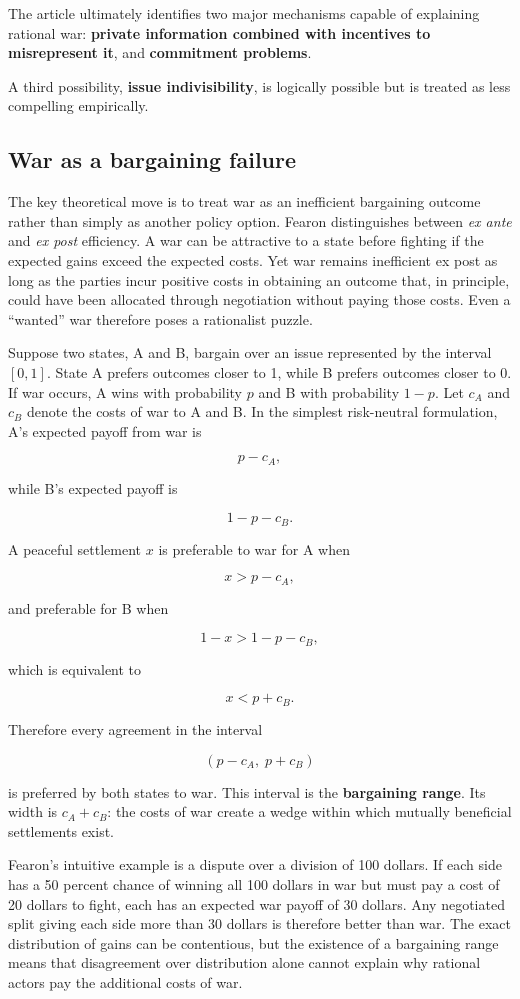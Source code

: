 The article ultimately identifies two major mechanisms capable of explaining rational war: \textbf{private information combined with incentives to misrepresent it}, and \textbf{commitment problems}.

A third possibility, \textbf{issue indivisibility}, is logically possible but is treated as less compelling empirically.

\subsection{War as a bargaining failure}
The key theoretical move is to treat war as an inefficient bargaining outcome rather than simply as another policy option. Fearon distinguishes between \textit{ex ante} and \textit{ex post} efficiency. A war can be attractive to a state before fighting if the expected gains exceed the expected costs. Yet war remains inefficient ex post as long as the parties incur positive costs in obtaining an outcome that, in principle, could have been allocated through negotiation without paying those costs. Even a ``wanted'' war therefore poses a rationalist puzzle.

Suppose two states, A and B, bargain over an issue represented by the interval $[0,1]$. State A prefers outcomes closer to 1, while B prefers outcomes closer to 0. If war occurs, A wins with probability $p$ and B with probability $1-p$. Let $c_A$ and $c_B$ denote the costs of war to A and B. In the simplest risk-neutral formulation, A's expected payoff from war is

\[
p-c_A,
\]

while B's expected payoff is

\[
1-p-c_B.
\]

A peaceful settlement $x$ is preferable to war for A when

\[
x>p-c_A,
\]

and preferable for B when

\[
1-x>1-p-c_B,
\]

which is equivalent to

\[
x<p+c_B.
\]

Therefore every agreement in the interval

\[
(p-c_A,\;p+c_B)
\]

is preferred by both states to war. This interval is the \textbf{bargaining range}. Its width is $c_A+c_B$: the costs of war create a wedge within which mutually beneficial settlements exist.

Fearon's intuitive example is a dispute over a division of 100 dollars. If each side has a 50 percent chance of winning all 100 dollars in war but must pay a cost of 20 dollars to fight, each has an expected war payoff of 30 dollars. Any negotiated split giving each side more than 30 dollars is therefore better than war. The exact distribution of gains can be contentious, but the existence of a bargaining range means that disagreement over distribution alone cannot explain why rational actors pay the additional costs of war.

